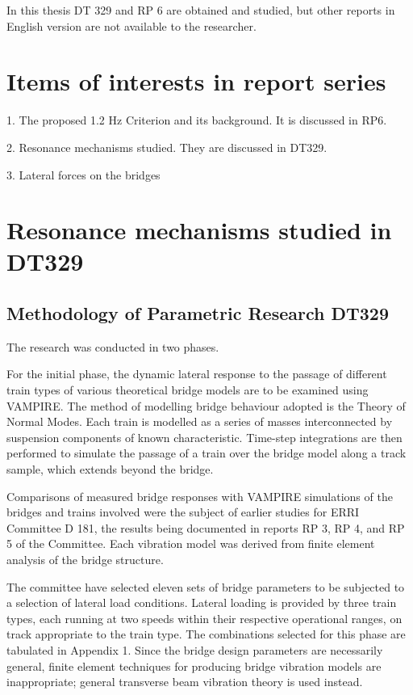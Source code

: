 \begin{appendices}
In this thesis DT 329 and RP 6 are obtained and studied, but other reports in English version are not available to the researcher.

\section{Items of interests in report series}

1. The proposed 1.2 Hz Criterion and its background. It is discussed in RP6.

2. Resonance mechanisms studied. They are discussed in DT329.

3. Lateral forces on the bridges

\section{Resonance mechanisms studied in DT329}
\subsection{Methodology of Parametric Research DT329}

The research was conducted in two phases.

For the initial phase, the dynamic lateral response to the passage of different train types of various theoretical bridge models are to be examined using VAMPIRE. The method of modelling bridge behaviour adopted is the Theory of Normal Modes. Each train is modelled as a series of masses interconnected by suspension components of known characteristic. Time-step integrations are then performed to simulate the passage of a train over the bridge model along a track sample, which extends beyond the bridge.

Comparisons of measured bridge responses with VAMPIRE simulations of the bridges and trains involved were the subject of earlier studies for ERRI Committee D 181, the results being documented in reports RP 3, RP 4, and RP 5 of the Committee. Each vibration model was derived from finite element analysis of the bridge structure.

The committee have selected eleven sets of bridge parameters to be subjected to a selection of lateral load conditions. Lateral loading is provided by three train types, each running at two speeds within their respective operational ranges, on track appropriate to the train type. The combinations selected for this phase are tabulated in Appendix 1. Since the bridge design parameters are necessarily general, finite element techniques for producing bridge vibration models are inappropriate; general transverse beam vibration theory is used instead.


\end{appendices}

